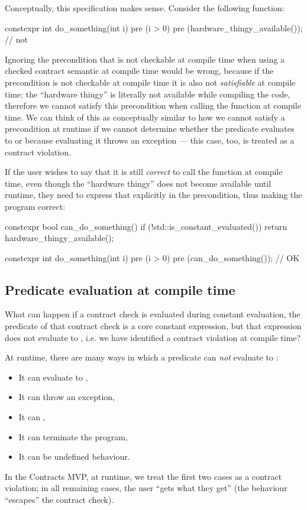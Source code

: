 Conceptually, this specification makes sense. Consider the following function:

\begin{codeblock}
constexpr int do_something(int i)
  pre (i > 0)
  pre (hardware_thingy_available());  // not 
\end{codeblock}

Ignoring the precondition that is not checkable at compile time when using a checked contract semantic at compile time would be wrong, because if the precondition is not checkable at compile time it is also not \emph{satisfiable} at compile time: the ``hardware thingy'' is literally not available while compiling the code, therefore we cannot satisfy this precondition when calling the function at compile time. We can think of this as conceptually similar to how we cannot satisfy a precondition at runtime if we cannot determine whether the predicate evaluates to  or  because evaluating it throws an exception --- this case, too, is treated as a contract violation.

If the user wishes to say that it is still \emph{correct} to call the function at compile time, even though the ``hardware thingy'' does not become available until runtime, they need to express that explicitly in the precondition, thus making the program correct:

\begin{codeblock}
constexpr bool can_do_something() {
  if (!std::is_constant_evaluated())
    return hardware_thingy_available();
}

constexpr int do_something(int i)
  pre (i > 0)
  pre (can_do_something());  // OK
\end{codeblock}

\subsection{Predicate evaluation at compile time}

What can happen if a contract check is evaluated during constant evaluation, the predicate of that contract check is a core constant expression, but that expression does not evaluate to , i.e. we have identified a contract violation at compile time?

At runtime, there are many ways in which a predicate can \emph{not} evaluate to :
\begin{itemize}
\item It can evaluate to ,
\item It can throw an exception,
\item It can ,
\item It can terminate the program,
\item It can be undefined behaviour.
\end{itemize}
In the Contracts MVP, at runtime, we treat the first two cases as a contract violation; in all remaining cases, the user ``gets what they get'' (the behaviour ``escapes'' the contract check).

